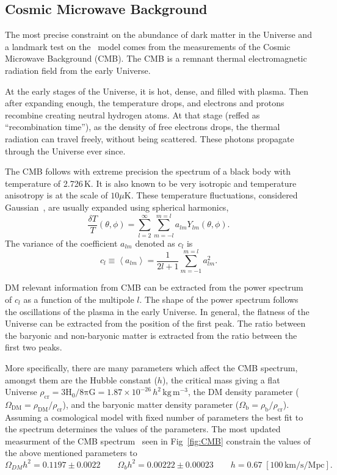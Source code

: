 \subsection{Cosmic Microwave Background}
The most precise constraint on the abundance of dark matter in the Universe and a landmark test on the \cdm\ model comes from the measurements of the Cosmic Microwave Background (CMB). The CMB is a remnant thermal electromagnetic radiation field from the early Universe. 

At the early stages of the Universe, it is hot, dense, and filled with plasma. Then after expanding enough, the temperature drops, and electrons and protons  recombine creating neutral hydrogen atoms. At that stage (reffed as ``recombination time''), as the density of free electrons drops, the thermal radiation can travel freely, without being scattered. These photons propagate through the Universe ever since.       

The CMB follows with extreme precision the spectrum of a black body with temperature of 2.726\,K. It is also known to be very isotropic and temperature  anisotropy is at the scale of $10\mu$K. These temperature fluctuations, considered Gaussian~\cite{WMAP:9years}, are usually expanded using spherical harmonics,
\begin{equation}
\frac{\delta T }{T}(\theta,\phi) = \sum_{l=2}^{\infty}\sum_{m=-l}^{m=l}a_{lm}Y_{lm}(\theta,\phi).
\end{equation} 
The variance of the coefficient $a_{lm}$ denoted as $c_l$ is
\begin{equation}
c_l \equiv \left< a_{lm} \right> = \frac{1}{2l+1}\sum_{m=-1}^{m=l}a_{lm}^2.
\end{equation}

DM relevant information from CMB can be extracted from the power spectrum of $c_l$ as a function of the multipole $l$. The shape of the power spectrum follows the oscillations of the plasma in the early Universe. In general, the flatness of the Universe can be extracted from the position of the first peak. The ratio between the baryonic and non-baryonic matter is extracted from the ratio between the first two peaks.   

More specifically, there are many parameters which affect the CMB spectrum,  amongst them are the Hubble constant ($h$), the critical mass giving a flat Universe $\rho_{\mathrm{cr}} = \mathrm{3H_0}/\mathrm{8 \pi G} = 1.87\times10^{-26}\,h^2\,\mathrm{kg\,m^{-3}}$, the DM density parameter ($ \Omega_{\mathrm{DM}} = \rho_{\mathrm{DM}}/\rho_{\mathrm{cr}}$), and the baryonic matter density parameter ($\Omega_{\mathrm{b}} = \rho_{\mathrm{b}}/\rho_{\mathrm{cr}}$). Assuming a cosmological model with fixed number of parameters the best fit to the spectrum determines the values of the parameters. The most updated measurment of the CMB spectrum~\cite{Planck} seen in Fig~\ref{fig:CMB} constrain the values of the above mentioned parameters to
\begin{equation}
\Omega_{DM}h^2 = 0.1197 \pm 0.0022 \qquad \Omega_{b}h^2 = 0.00222 \pm 0.00023 \qquad h=0.67\;[100\, \mathrm{km/s/Mpc}]. 
\end{equation}

